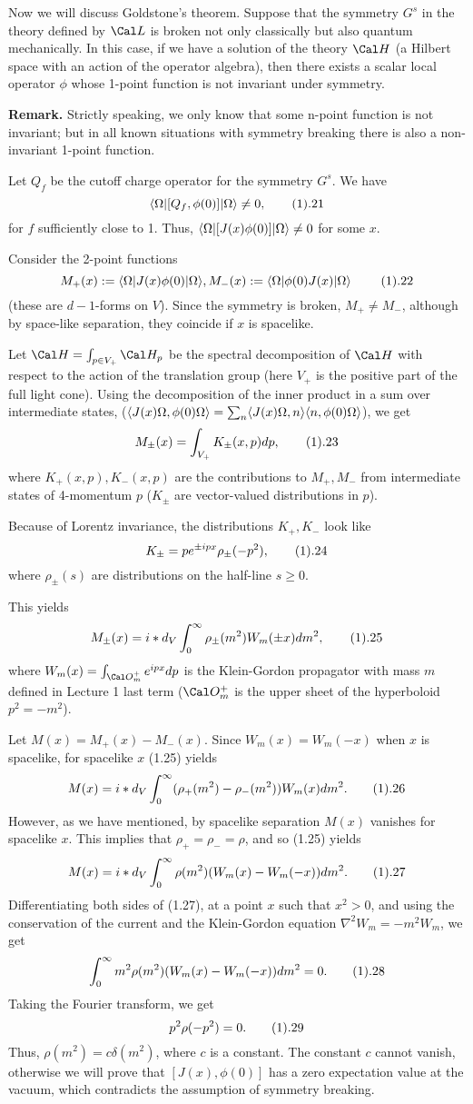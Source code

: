 Now we will discuss Goldstone's theorem. Suppose that the symmetry $G^s$
in the theory defined by $\Cal L$ is broken not only classically
but also quantum mechanically. In this case, if we have a solution
of the theory $\Cal H$ (a Hilbert space with an action of
the operator algebra), then there exists a scalar local operator $\phi$ 
whose 1-point function is not invariant under symmetry. 

{\bf Remark.} Strictly speaking, we only know that some n-point function
is not invariant; but in all known situations 
with symmetry breaking there is also a non-invariant 1-point function.  

Let $Q_f$ be the cutoff charge operator for the symmetry $G^s$. 
We have 
$$
\<\Omega|[Q_f,\phi(0)]|\Omega\>\ne 0,\tag 1.21
$$
for $f$ sufficiently close to 1. Thus, 
$\langle\Omega|[J(x)\phi(0)]|\Omega\rangle\ne 0$ for some $x$. 

Consider the 2-point functions
$$
M_+(x):=\<\Omega|J(x)\phi(0)|\Omega\>, 
M_-(x):=\<\Omega|\phi(0)J(x)|\Omega\>\ \tag 1.22
$$
(these are $d-1$-forms on $V$). Since the symmetry is broken, 
$M_+\ne M_-$, although by space-like separation, they coincide if $x$ is 
spacelike. 

Let $\Cal H=\int_{p\in V_+}\Cal H_p$ be the spectral decomposition 
of $\Cal H$ with respect to the action of the translation group
(here $V_+$ is the positive part of the full light cone).
Using the decomposition of the inner product in a sum over intermediate 
states, ($\langle J(x)\Omega,\phi(0)\Omega\rangle=\sum_n\langle J(x)\Omega,n\rangle
\langle n,\phi(0)\Omega\rangle$), we get
$$
M_\pm(x)=\int_{V_+} K_\pm(x,p)dp,\tag 1.23
$$
where 
$K_+(x,p), K_-(x,p)$ are the contributions to $M_+,M_-$ 
from intermediate states of 4-momentum $p$ 
($K_\pm$ are vector-valued distributions in $p$). 

Because of Lorentz invariance, 
the distributions $K_+,K_-$ look like 
$$
K_\pm=pe^{\pm ipx}\rho_\pm(-p^2),\tag 1.24
$$
where $\rho_\pm(s)$ are distributions on the half-line 
$s\ge 0$. 

This yields 
$$
M_\pm(x)=i*d_V\int_0^\infty\rho_\pm(m^2)W_m(\pm x)dm^2,\tag 1.25
$$
where $W_m(x)=\int_{\O_m^+}e^{ipx}dp$ 
is the Klein-Gordon propagator with mass $m$ defined in Lecture 
1 last term ($\O_m^+$ is the upper sheet of the hyperboloid $p^2=-m^2$).

Let $M(x)=M_+(x)-M_-(x)$. 
Since $W_m(x)=W_m(-x)$ when $x$ is spacelike, for spacelike $x$
(1.25) yields
$$
M(x)=i*d_V\int_0^\infty(\rho_+(m^2)-\rho_-(m^2))W_m(x)dm^2.\tag 1.26
$$
However, as we have mentioned, by spacelike separation
$M(x)$ vanishes for spacelike $x$. This implies that $\rho_+=\rho_-=\rho$, and
so (1.25) yields 
$$
M(x)=i*d_V\int_0^\infty\rho(m^2)(W_m(x)-W_m(-x))dm^2.\tag 1.27
$$
Differentiating both sides of (1.27), at a point $x$ such that $x^2>0$, 
and using the conservation of the current 
and the Klein-Gordon equation $\nabla^2W_m=-m^2W_m$, we get
$$
\int_0^\infty m^2\rho(m^2)(W_m(x)-W_m(-x))dm^2=0.\tag 1.28
$$
Taking the Fourier transform, we get
$$
p^2\rho(-p^2)=0.\tag 1.29
$$
Thus, $\rho(m^2)=c\delta(m^2)$, where $c$ is a constant. 
The constant $c$ cannot vanish, otherwise we will prove that 
$[J(x),\phi(0)]$ has a zero expectation value at the vacuum, 
which contradicts the assumption 
of symmetry breaking. 

